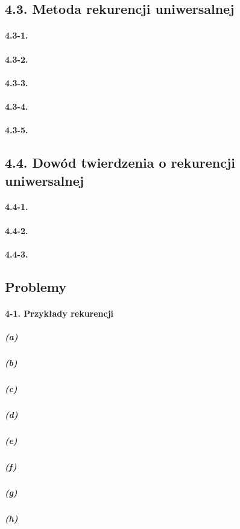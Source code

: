 \subsection*{4.3. Metoda rekurencji uniwersalnej}

\paragraph{4.3-1.}
\paragraph{4.3-2.}
\paragraph{4.3-3.}
\paragraph{4.3-4.}
\paragraph{4.3-5.}

\subsection*{4.4. Dowód twierdzenia o rekurencji uniwersalnej}

\paragraph{4.4-1.}
\paragraph{4.4-2.}
\paragraph{4.4-3.}

\subsection*{Problemy}

\paragraph{4-1. Przykłady rekurencji}

\subparagraph{(a)}
\subparagraph{(b)}
\subparagraph{(c)}
\subparagraph{(d)}
\subparagraph{(e)}
\subparagraph{(f)}
\subparagraph{(g)}
\subparagraph{(h)}

